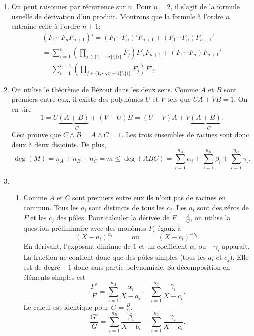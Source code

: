 \begin{enumerate}
 \item On peut raisonner par récurrence sur $n$. Pour $n=2$, il s'agit de la formule usuelle de dérivation d'un produit. Montrons que la formule à l'ordre $n$ entraîne celle à l'ordre $n+1$:
\begin{multline*}
 (F_1\cdots F_n F_{n+1})' = (F_1\cdots F_n )'F_{n+1} + (F_1\cdots F_n) F_{n+1}'\\
= \sum_{i=1}^{n}\left( \prod_{j\in\{1,\cdots,n\}\setminus\{i\}}F_j\right)F'_i F_{n+1} + (F_1\cdots F_n) F_{n+1}'\\
=  \sum_{i=1}^{n+1}\left( \prod_{j\in\{1,\cdots,n+1\}\setminus\{i\}}F_j\right)F'_i .
\end{multline*}

 \item On utilise le théorème de Bézout dans les deux sens. Comme $A$ et $B$ sont premiers entre eux, il existe des polynômes $U$ et $V$ tels que $UA + VB=1$. On en tire
\begin{displaymath}
 1 = U\underset{=C}{\underbrace{(A+B)}} +(V-U)B = (U-V)A+V\underset{=C}{\underbrace{(A+B)}}.
\end{displaymath}
Ceci prouve que $C\wedge B = A\wedge C =1$. Les trois ensembles de racines sont donc deux à deux disjoints. De plus,
\begin{displaymath}
 \deg(M) = n_A + n_B + n_C = m \leq \deg(ABC) = \sum_{i=1}^{n_A}\alpha_i + \sum_{i=1}^{n_B}\beta_i + \sum_{i=1}^{n_C}\gamma_i .
\end{displaymath}


 \item
\begin{enumerate}
 \item Comme $A$ et $C$ sont premiers entre eux ils n'ont pas de racines en commun. Tous les $a_i$ sont distincts de tous les $c_j$. Les $a_i$ sont des zéros de $F$ et les $c_j$ des pôles. Pour calculer la dérivée de $F=\frac{A}{C}$, on utilise la question préliminaire avec des monômes $F_i$ égaux à
\begin{displaymath}
 (X-a_i)^{\alpha_i}\hspace{1cm}\text{ ou }\hspace{1cm} (X-c_i)^{-\gamma_i} .
\end{displaymath}
En dérivant, l'exposant diminue de $1$ et un coefficient $\alpha_i$ ou $-\gamma_i$ apparait. La fraction ne contient donc que des pôles simples (tous les $a_i$ et $c_j$). Elle est de degré $-1$ donc sans partie polynomiale. Sa décomposition en éléments simples est
\begin{displaymath}
 \frac{F'}{F} =  \sum_{i=1}^{n_A}\frac{\alpha_i}{X-a_i} -\sum_{i=1}^{n_C}\frac{\gamma_i}{X-c_i} .
\end{displaymath}
Le calcul est identique pour $G=\frac{B}{C}$. 
\begin{displaymath}
 \frac{G'}{G} =  \sum_{i=1}^{n_B}\frac{\beta_i}{X-b_i} -\sum_{i=1}^{n_C}\frac{\gamma_i}{X-c_i} .
\end{displaymath}


\end{enumerate}
\end{enumerate}
